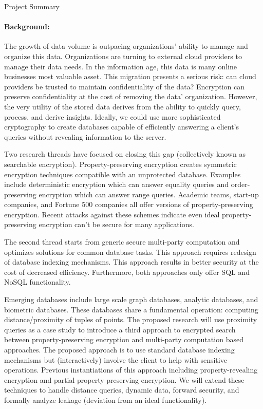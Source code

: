 \documentclass[11pt]{article}
\begin{document}
\begin{centering}
\LARGE
Project Summary
\hline
\end{centering}

\paragraph{Background:}  
The growth of data volume is outpacing organizations' ability to manage and organize this data. Organizations are turning to external cloud providers to manage their data needs.  In the information age, this data is many online businesses most valuable asset.  This migration presents a serious risk: can cloud providers be trusted to maintain confidentiality of the data?  Encryption can preserve confidentiality at the cost of removing the data' organization.  However, the very utility of the stored data derives from the ability to quickly query, process, and derive insights.  Ideally, we could use more sophisticated cryptography to create databases capable of efficiently answering a client's queries without revealing information to the server.  

Two research threads have focused on closing this gap (collectively known as searchable encryption).
Property-preserving encryption creates symmetric encryption techniques compatible with an unprotected database. Examples include deterministic encryption which can answer equality queries and order-preserving encryption which can answer range queries. Academic teams, start-up companies, and Fortune 500 companies all offer versions of property-preserving encryption.  Recent attacks against these schemes indicate even ideal property-preserving encryption can't be secure for many applications.

The second thread starts from generic secure multi-party computation and optimizes solutions for common database tasks.  This approach requires redesign of database indexing mechanisms.  This approach results in better security at the cost of decreased efficiency.  Furthermore, both approaches only offer SQL and NoSQL functionality.

Emerging databases include large scale graph databases, analytic databases, and biometric databases.  These databases share a fundamental operation: computing distance/proximity of tuples of points.  The proposed research will use proximity queries as a case study to introduce a third approach to encrypted search between property-preserving encryption and multi-party computation based approaches.  The proposed approach is to use standard database indexing mechanisms but (interactively) involve the client to help with sensitive operations. Previous instantiations of this approach including property-revealing encryption and partial property-preserving encryption.  We will extend these techniques to handle distance queries, dynamic data, forward security, and formally analyze leakage (deviation from an ideal functionality).
\end{document}
